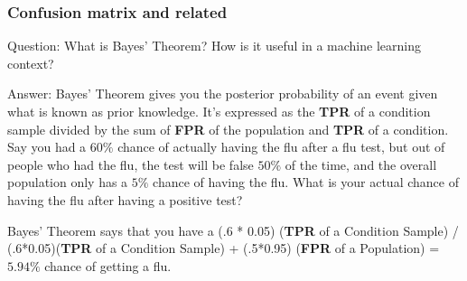 \documentclass[11pt]{beamer}
\begin{document}
\begin{frame}
\frametitle{Confusion matrix and related}
\begin{block}{Question:}
	What is Bayes’ Theorem? How is it useful in a machine learning context?
\end{block}
\begin{block}{Answer:}
	Bayes’ Theorem gives you the posterior probability of an event given what is known as prior knowledge. It’s expressed as the \textbf{TPR} of a condition sample divided by the sum of \textbf{FPR} of the population and \textbf{TPR} of a condition. Say you had a $60\%$ chance of actually having the flu after a flu test, but out of people who had the flu, the test will be false $50\%$ of the time, and the overall population only has a $5\%$ chance of having the flu. What is your actual chance of having the flu after having a positive test?
	
	Bayes’ Theorem says that you have a (.6 * 0.05) (\textbf{TPR} of a Condition Sample) / (.6*0.05)(\textbf{TPR} of a Condition Sample) + (.5*0.95) (\textbf{FPR} of a Population)  = $5.94\%$ chance of getting a flu.
\end{block}
\end{frame}
\end{document}
